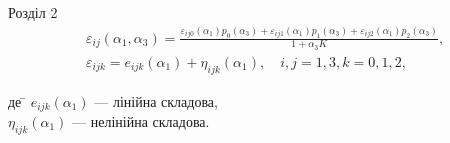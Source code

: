 \documentclass[8pt]{beamer}
\numberwithin{figure}{section}
\numberwithin{equation}{section}
\numberwithin{table}{section}
\begin{document}
\begin{frame}{Розділ 2}
\begin{equation}
\begin{aligned}
&\varepsilon_{ij} \left( \alpha_1, \alpha_3 \right) = \frac{\varepsilon_{ij0} \left( \alpha_1\right)p_0 \left( \alpha_3\right)+\varepsilon_{ij1} \left( \alpha_1\right)p_1 \left( \alpha_3\right)+\varepsilon_{ij2} \left( \alpha_1\right)p_2 \left( \alpha_3\right)}{1+\alpha_3 K},\\
&\varepsilon_{ijk} = e_{ijk}\left( \alpha_1\right)+\eta_{ijk}\left( \alpha_1\right), \quad i,j=1,3, k=0,1,2,
\end{aligned}
\end{equation}

\begin{tabbing}
де \= $e_{ijk}\left( \alpha_1\right)$ --- лінійна складова,\\
\> $\eta_{ijk}\left( \alpha_1\right)$ --- нелінійна складова.
\end{tabbing}



\end{frame}
\end{document}

